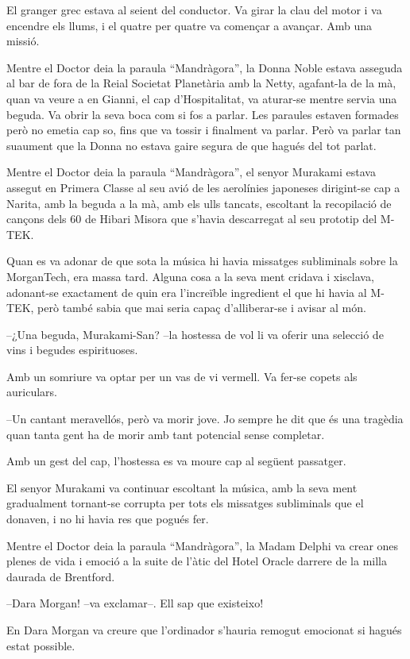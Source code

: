 El granger grec estava al seient del conductor. Va girar la clau del
motor i va encendre els llums, i el quatre per quatre va començar a
avançar. Amb una missió.

Mentre el Doctor deia la paraula ``Mandràgora'', la Donna Noble estava
asseguda al bar de fora de la Reial Societat Planetària amb la Netty,
agafant-la de la mà, quan va veure a en Gianni, el cap d'Hospitalitat,
va aturar-se mentre servia una beguda. Va obrir la seva boca com si fos
a parlar. Les paraules estaven formades però no emetia cap so, fins que
va tossir i finalment va parlar. Però va parlar tan suaument que la
Donna no estava gaire segura de que hagués del tot parlat.

Mentre el Doctor deia la paraula ``Mandràgora'', el senyor Murakami
estava assegut en Primera Classe al seu avió de les aerolínies japoneses
dirigint-se cap a Narita, amb la beguda a la mà, amb els ulls tancats,
escoltant la recopilació de cançons dels 60 de Hibari Misora que s'havia
descarregat al seu prototip del M-TEK.

Quan es va adonar de que sota la música hi havia missatges subliminals
sobre la MorganTech, era massa tard. Alguna cosa a la seva ment cridava
i xisclava, adonant-se exactament de quin era l'increïble ingredient el
que hi havia al M-TEK, però també sabia que mai seria capaç
d'alliberar-se i avisar al món.

--¿Una beguda, Murakami-San? --la hostessa de vol li va oferir una
selecció de vins i begudes espirituoses.

Amb un somriure va optar per un vas de vi vermell. Va fer-se copets als
auriculars.

--Un cantant meravellós, però va morir jove. Jo sempre he dit que és una
tragèdia quan tanta gent ha de morir amb tant potencial sense completar.

Amb un gest del cap, l'hostessa es va moure cap al següent passatger.

El senyor Murakami va continuar escoltant la música, amb la seva ment
gradualment tornant-se corrupta per tots els missatges subliminals que
el donaven, i no hi havia res que pogués fer.

Mentre el Doctor deia la paraula ``Mandràgora'', la Madam Delphi va
crear ones plenes de vida i emoció a la suite de l'àtic del Hotel Oracle
darrere de la milla daurada de Brentford.

--Dara Morgan! --va exclamar--. Ell sap que existeixo!

En Dara Morgan va creure que l'ordinador s'hauria remogut emocionat si
hagués estat possible.

